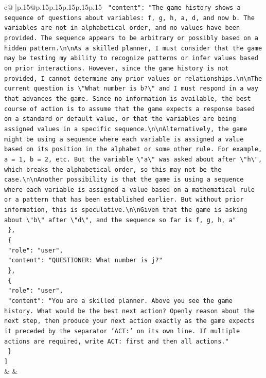 \documentclass{article}
\begin{document}
{\begin{supertabular}{c@{$\;$}|p{.15\linewidth}@{}p{.15\linewidth}p{.15\linewidth}p{.15\linewidth}p{.15\linewidth}p{.15\linewidth}}
{{{\texttt{    "content": "The game history shows a sequence of questions about variables: f, g, h, a, d, and now b. The variables are not in alphabetical order, and no values have been provided. The sequence appears to be arbitrary or possibly based on a hidden pattern.\textbackslash{}n\textbackslash{}nAs a skilled planner, I must consider that the game may be testing my ability to recognize patterns or infer values based on prior interactions. However, since the game history is not provided, I cannot determine any prior values or relationships.\textbackslash{}n\textbackslash{}nThe current question is \textbackslash{}"What number is b?\textbackslash{}" and I must respond in a way that advances the game. Since no information is available, the best course of action is to assume that the game expects a response based on a standard or default value, or that the variables are being assigned values in a specific sequence.\textbackslash{}n\textbackslash{}nAlternatively, the game might be using a sequence where each variable is assigned a value based on its position in the alphabet or some other rule. For example, a = 1, b = 2, etc. But the variable \textbackslash{}"a\textbackslash{}" was asked about after \textbackslash{}"h\textbackslash{}", which breaks the alphabetical order, so this may not be the case.\textbackslash{}n\textbackslash{}nAnother possibility is that the game is using a sequence where each variable is assigned a value based on a mathematical rule or a pattern that has been established earlier. But without prior information, this is speculative.\textbackslash{}n\textbackslash{}nGiven that the game is asking about \textbackslash{}"b\textbackslash{}" after \textbackslash{}"d\textbackslash{}", and the sequence so far is f, g, h, a"} \\
\texttt{  \},} \\
\texttt{  \{} \\
\texttt{    "role": "user",} \\
\texttt{    "content": "QUESTIONER: What number is j?"} \\
\texttt{  \},} \\
\texttt{  \{} \\
\texttt{    "role": "user",} \\
\texttt{    "content": "You are a skilled planner. Above you see the game history. What would be the best next action? Openly reason about the next step, then produce your next action exactly as the game expects it preceded by the separator 'ACT:' on its own line. If multiple actions are required, write ACT: first and then all actions."} \\
\texttt{  \}} \\
\texttt{{]}} \\
            }
        }
    }
    & & \\ \\


\end{supertabular}}
\end{document}
